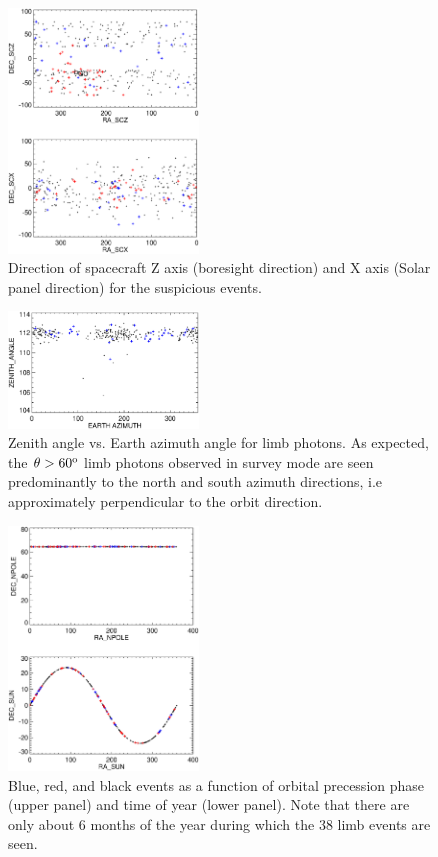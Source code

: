 \documentclass[aps,twocolumn,prd,superscriptaddress,showpacs,nofootinbib,fixfloat]{revtex4}
\newcommand{\degree}{^{\rm o}}
\begin{document}
\begin{figure}[p]
\centering
\includegraphics[width=0.45\textwidth]{plots/spacecraft-zx.ps}
\caption{Direction of spacecraft Z axis (boresight direction) and X axis
(Solar panel direction) for the suspicious events.
}
\label{fig:spacecraft-zx}
\end{figure}

\begin{figure}[p]
\centering
\includegraphics[width=0.45\textwidth]{plots/earth-az.ps}
\caption{Zenith angle vs. Earth azimuth angle for limb photons.  As expected,
  the $\theta > 60\degree$ limb photons observed in survey mode are seen
  predominantly to the north and south azimuth directions, i.e approximately
  perpendicular to the orbit direction.  }
\label{fig:earth-az}
\end{figure}

\begin{figure}[p]
\centering
\includegraphics[width=0.45\textwidth]{plots/sun.ps}
\caption{Blue, red, and black events as a function of orbital precession phase
  (upper panel) and time of year (lower panel).  Note that there are only
  about 6 months of the year during which the 38 limb events are seen. 
}
\label{fig:sun}
\end{figure}
\end{document}
